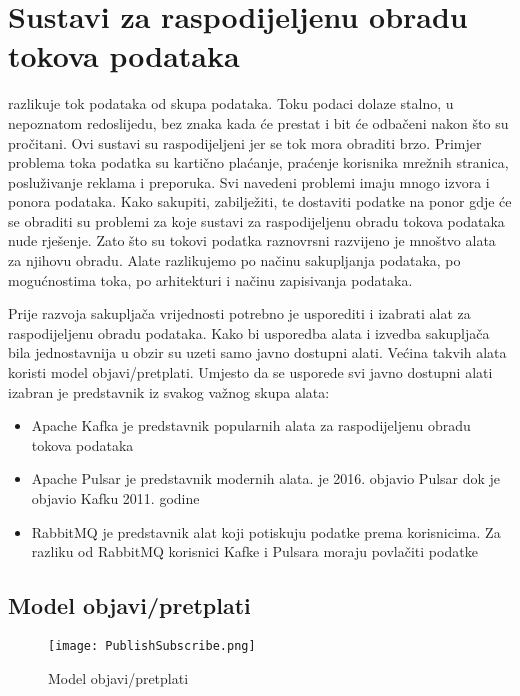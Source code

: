 \documentclass[times, utf8, diplomski, numeric]{fer}
\begin{document}
\chapter{Sustavi za raspodijeljenu obradu tokova podataka}

\citep{ilprints535} razlikuje tok podataka od skupa podataka. Toku podaci dolaze stalno, u nepoznatom redoslijedu, bez znaka kada će prestat i bit će odbačeni nakon što su pročitani. Ovi sustavi su raspodijeljeni jer se tok mora obraditi brzo. Primjer problema toka podatka su kartično plaćanje, praćenje korisnika mrežnih stranica, posluživanje reklama i preporuka. Svi navedeni problemi imaju mnogo izvora i ponora podataka. Kako sakupiti, zabilježiti, te dostaviti podatke na ponor gdje će se obraditi su problemi za koje sustavi za raspodijeljenu obradu tokova podataka nude rješenje. Zato što su tokovi podatka raznovrsni razvijeno je mnoštvo alata za njihovu obradu. Alate razlikujemo po načinu sakupljanja podataka, po mogućnostima toka, po arhitekturi i načinu zapisivanja podataka.

Prije razvoja sakupljača vrijednosti potrebno je usporediti i izabrati alat za raspodijeljenu obradu podataka. Kako bi usporedba alata i izvedba sakupljača bila jednostavnija u obzir su uzeti samo javno dostupni alati. Većina takvih alata koristi model objavi/pretplati. Umjesto da se usporede svi javno dostupni alati izabran je predstavnik iz svakog važnog skupa alata:
\begin{itemize}
    \item Apache Kafka je predstavnik popularnih alata za raspodijeljenu obradu tokova podataka
    \item Apache Pulsar je predstavnik modernih alata. \citep{yahoo-blogpost} je 2016. objavio Pulsar dok je \citep{kafka-whitepaper} objavio Kafku 2011. godine
    \item RabbitMQ je predstavnik alat koji potiskuju podatke prema korisnicima. Za razliku od RabbitMQ korisnici Kafke i Pulsara moraju povlačiti podatke
\end{itemize}

\section{Model objavi/pretplati}

\begin{figure}[H]
    \centering
    \texttt{[image: PublishSubscribe.png]}
    \caption{Model objavi/pretplati}
    \label{fig:publish-subscribe}
\end{figure}
\end{document}

